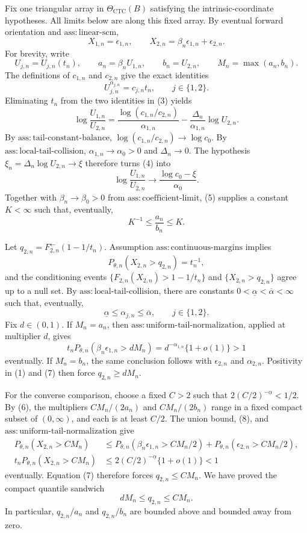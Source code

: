 Fix one triangular array in \(\Theta_{\mathrm{CTC}}(B)\) satisfying the intrinsic-coordinate hypotheses. All limits below are along this fixed array. By eventual forward orientation and \(\mathrm{ass{:}linear\text{-}scm}\),
\[
X_{1,n}=\epsilon_{1,n},
\qquad
X_{2,n}=\beta_n\epsilon_{1,n}+\epsilon_{2,n}.
\tag{1}
\]
For brevity, write
\[
U_{j,n}=U_{j,n}(t_n),
\qquad
a_n=\beta_nU_{1,n},
\qquad
b_n=U_{2,n},
\qquad
M_n=\max(a_n,b_n).
\tag{2}
\]
The definitions of \(c_{1,n}\) and \(c_{2,n}\) give the exact identities
\[
U_{j,n}^{\alpha_{j,n}}=c_{j,n}t_n,
\qquad j\in\{1,2\}.
\tag{3}
\]
Eliminating \(t_n\) from the two identities in (3) yields
\[
\log\frac{U_{1,n}}{U_{2,n}}
=\frac{\log(c_{1,n}/c_{2,n})}{\alpha_{1,n}}
-\frac{\Delta_n}{\alpha_{1,n}}\log U_{2,n}.
\tag{4}
\]
By \(\mathrm{ass{:}tail\text{-}constant\text{-}balance}\), \(\log(c_{1,n}/c_{2,n})\to\log c_0\). By \(\mathrm{ass{:}local\text{-}tail\text{-}collision}\), \(\alpha_{1,n}\to\alpha_0>0\) and \(\Delta_n\to0\). The hypothesis \(\xi_n=\Delta_n\log U_{2,n}\to\xi\) therefore turns (4) into
\[
\log\frac{U_{1,n}}{U_{2,n}}
\longrightarrow \frac{\log c_0-\xi}{\alpha_0}.
\tag{5}
\]
Together with \(\beta_n\to\beta_0>0\) from \(\mathrm{ass{:}coefficient\text{-}limit}\), (5) supplies a constant \(K<\infty\) such that, eventually,
\[
K^{-1}\leq\frac{a_n}{b_n}\leq K.
\tag{6}
\]

Let \(q_{2,n}=F_{2,n}^{\leftarrow}(1-1/t_n)\). Assumption \(\mathrm{ass{:}continuous\text{-}margins}\) implies
\[
P_{\theta,n}(X_{2,n}>q_{2,n})=t_n^{-1},
\tag{7}
\]
and the conditioning events \(\{F_{2,n}(X_{2,n})>1-1/t_n\}\) and \(\{X_{2,n}>q_{2,n}\}\) agree up to a null set. By \(\mathrm{ass{:}local\text{-}tail\text{-}collision}\), there are constants \(0<\underline\alpha<\overline\alpha<\infty\) such that, eventually,
\[
\underline\alpha\leq\alpha_{j,n}\leq\overline\alpha,
\qquad j\in\{1,2\}.
\tag{8}
\]
Fix \(d\in(0,1)\). If \(M_n=a_n\), then \(\mathrm{ass{:}uniform\text{-}tail\text{-}normalization}\), applied at multiplier \(d\), gives
\[
t_nP_{\theta,n}(\beta_n\epsilon_{1,n}>dM_n)
=d^{-\alpha_{1,n}}\{1+o(1)\}>1
\tag{9}
\]
eventually. If \(M_n=b_n\), the same conclusion follows with \(\epsilon_{2,n}\) and \(\alpha_{2,n}\). Positivity in (1) and (7) then force \(q_{2,n}\geq dM_n\).

For the converse comparison, choose a fixed \(C>2\) such that \(2(C/2)^{-\underline\alpha}<1/2\). By (6), the multipliers \(CM_n/(2a_n)\) and \(CM_n/(2b_n)\) range in a fixed compact subset of \((0,\infty)\), and each is at least \(C/2\). The union bound, (8), and \(\mathrm{ass{:}uniform\text{-}tail\text{-}normalization}\) give
\[
\begin{split}
P_{\theta,n}(X_{2,n}>CM_n)
&\leq P_{\theta,n}(\beta_n\epsilon_{1,n}>CM_n/2)
+P_{\theta,n}(\epsilon_{2,n}>CM_n/2),\\
t_nP_{\theta,n}(X_{2,n}>CM_n)
&\leq 2(C/2)^{-\underline\alpha}\{1+o(1)\}<1
\end{split}
\tag{10}
\]
eventually. Equation (7) therefore forces \(q_{2,n}\leq CM_n\). We have proved the compact quantile sandwich
\[
dM_n\leq q_{2,n}\leq CM_n.
\tag{11}
\]
In particular, \(q_{2,n}/a_n\) and \(q_{2,n}/b_n\) are bounded above and bounded away from zero.

